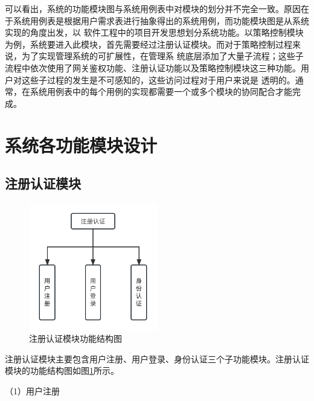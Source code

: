 可以看出，系统的功能模块图与系统用例表中对模块的划分并不完全一致。原因在于系统用例表是根据用户需求表进行抽象得出的系统用例，而功能模块图是从系统实现的角度出发，以
软件工程中的项目开发思想划分系统功能。以策略控制模块为例，系统要进入此模块，首先需要经过注册认证模块。而对于策略控制过程来说，为了实现管理系统的可扩展性，在管理系
统底层添加了大量子流程；这些子流程中依次使用了网关鉴权功能、注册认证功能以及策略控制模块这三种功能。用户对这些子过程的发生是不可感知的，这些访问过程对于用户来说是
透明的。通常，在系统用例表中的每个用例的实现都需要一个或多个模块的协同配合才能完成。

\section{系统各功能模块设计}

\subsection{注册认证模块}



\begin{figure}[h]
    \centering
    \includegraphics[width=0.5\textwidth]{my_figures/chapter4/注册认证模块功能结构图.png}
    \caption{注册认证模块功能结构图}
    \label{fig:注册认证模块功能结构图}
\end{figure}

注册认证模块主要包含用户注册、用户登录、身份认证三个子功能模块。注册认证模块的功能结构图如图\ref{fig:注册认证模块功能结构图}所示。



（1）用户注册

